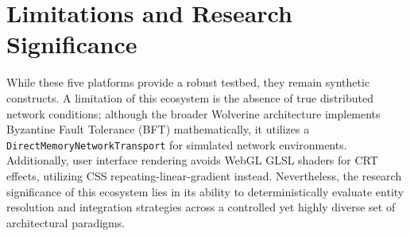 \section{Limitations and Research Significance}
While these five platforms provide a robust testbed, they remain synthetic constructs. A limitation of this ecosystem is the absence of true distributed network conditions; although the broader Wolverine architecture implements Byzantine Fault Tolerance (BFT) mathematically, it utilizes a \texttt{DirectMemoryNetworkTransport} for simulated network environments. Additionally, user interface rendering avoids WebGL GLSL shaders for CRT effects, utilizing CSS repeating-linear-gradient instead. Nevertheless, the research significance of this ecosystem lies in its ability to deterministically evaluate entity resolution and integration strategies across a controlled yet highly diverse set of architectural paradigms.

